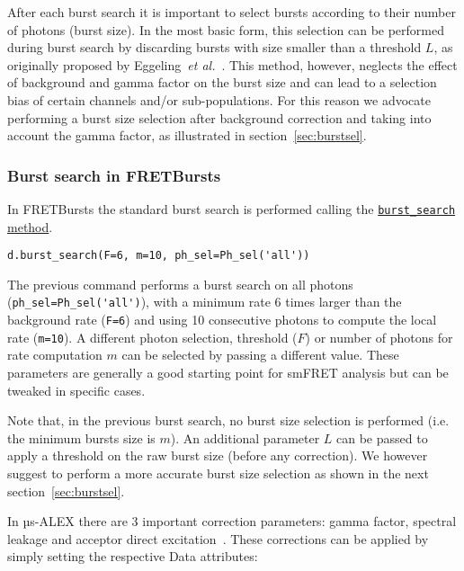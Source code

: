 After each burst search it is important to select
bursts according to their number of photons (burst size). In the most
basic form, this selection can be performed during burst search by discarding
bursts with size smaller than a threshold $L$, as originally proposed by 
Eggeling~\textit{et al.}~\cite{Eggeling_1998}. 
This method, however, neglects the effect
of background and gamma factor on the burst size and can lead to a selection
bias of certain channels and/or sub-populations. 
For this reason we advocate performing a burst size selection after background
correction and taking into account the gamma factor, as illustrated in
section~\ref{sec:burstsel}.

\subsubsection{Burst search in FRETBursts}
\label{sec:burstsearch_code}

In FRETBursts the standard burst search is performed calling the
\href{http://fretbursts.readthedocs.org/en/latest/data\_class.html#fretbursts.burstlib.Data.burst\_search}{\texttt{burst\_search} method}.

\begin{verbatim}
d.burst_search(F=6, m=10, ph_sel=Ph_sel('all'))
\end{verbatim}

The previous command performs a burst search on all photons
(\verb|ph_sel=Ph_sel('all')|), with a minimum rate 6 times larger than the
background rate (\verb|F=6|) and using 10 consecutive photons to compute the
local rate (\verb|m=10|).
A different photon selection, threshold ($F$) or number of photons for rate
computation $m$ can be selected by passing a different value. These parameters
are generally a good starting point for smFRET analysis but can be tweaked in
specific cases.

Note that, in the previous burst search, no burst size selection is performed
(i.e. the minimum bursts size is $m$). 
An additional parameter $L$ can be passed to apply a threshold on the raw burst
size (before any correction). 
We however suggest to perform a more accurate burst size selection as shown in
the next section~\ref{sec:burstsel}.

In µs-ALEX there are 3 important correction parameters: gamma factor, spectral
leakage and 
acceptor direct excitation~\cite{Lee_2005}. These corrections can be applied by
simply setting the respective
Data attributes:

